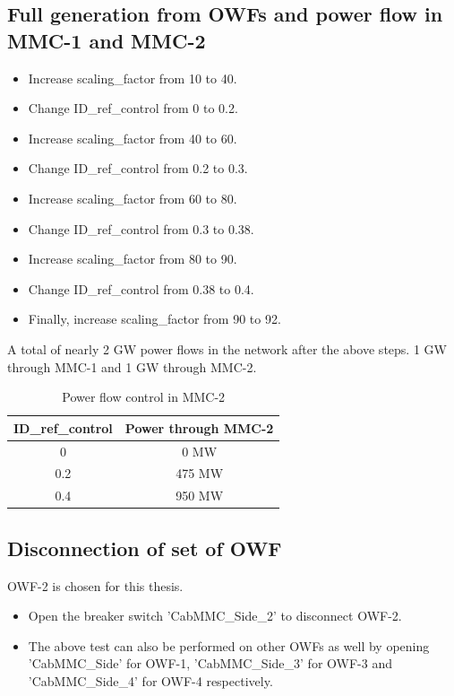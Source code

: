\subsection{Full generation from OWFs and power flow in MMC-1 and MMC-2}\label{full_gen_appendix}
    \begin{itemize}
        \item Increase scaling\_factor from 10 to 40.
        \item Change ID\_ref\_control from 0 to 0.2.
        \item Increase scaling\_factor from 40 to 60.
        \item Change ID\_ref\_control from 0.2 to 0.3.
        \item Increase scaling\_factor from 60 to 80.
        \item Change ID\_ref\_control from 0.3 to 0.38.
        \item Increase scaling\_factor from 80 to 90.
        \item Change ID\_ref\_control from 0.38 to 0.4.
        \item Finally, increase scaling\_factor from 90 to 92.
    \end{itemize} 

A total of nearly 2 GW power flows in the network after the above steps. 1 GW through \gls{MMC}-1 and 1 GW through \gls{MMC}-2.


 \begin{table}[H]
 \centering
\begin{tabular}{|c|c|}
\hline
\textbf{ID\_ref\_control} & \textbf{Power through MMC-2} \\ \hline
0                    & 0 MW                         \\ \hline
0.2                  & 475 MW                       \\ \hline
0.4                  & 950 MW                       \\ \hline
\end{tabular}
\caption{Power flow control in MMC-2}
\label{tab:Power_flow_control_in_MMC-2}
\end{table}

\subsection{Disconnection of set of OWF}
\gls{OWF}-2 is chosen for this thesis. 
\begin{itemize}
    \item Open the breaker switch 'CabMMC\_Side\_2' to disconnect \gls{OWF}-2.
    \item The above test can also be performed on other \gls{OWF}s as well by opening 'CabMMC\_Side' for \gls{OWF}-1, 'CabMMC\_Side\_3' for \gls{OWF}-3 and 'CabMMC\_Side\_4' for \gls{OWF}-4 respectively.
\end{itemize}

